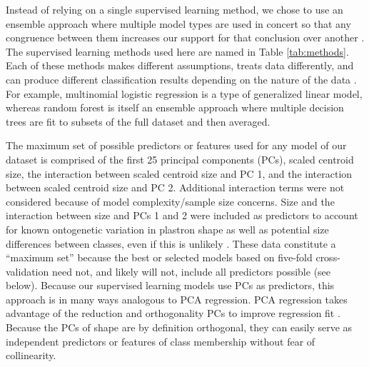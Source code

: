 \documentclass[10pt,letterpaper]{article}
\begin{document}
Instead of relying on a single supervised learning method, we chose to use an ensemble approach where multiple model types are used in concert so that any congruence between them increases our support for that conclusion over another \cite{Hastie2009}. The supervised learning methods used here are named in Table \ref{tab:methods}. Each of these methods makes different assumptions, treats data differently, and can produce different classification results depending on the nature of the data \cite{Hastie2009}. For example, multinomial logistic regression is a type of generalized linear model, whereas random forest is itself an ensemble approach where multiple decision trees are fit to subsets of the full dataset and then averaged.

The maximum set of possible predictors or features used for any model of our dataset is comprised of the first 25 principal components (PCs), scaled centroid size, the interaction between scaled centroid size and PC 1, and the interaction between scaled centroid size and PC 2. Additional interaction terms were not considered because of model complexity/sample size concerns. Size and the interaction between size and PCs 1 and 2 were included as predictors to account for known ontogenetic variation in plastron shape \cite{Angielczyk2013a} as well as potential size differences between classes, even if this is unlikely \cite{Seeliger1945,Holland1992}. These data constitute a ``maximum set'' because the best or selected models based on five-fold cross-validation need not, and likely will not, include all predictors possible (see below). Because our supervised learning models use PCs as predictors, this approach is in many ways analogous to PCA regression. PCA regression takes advantage of the reduction and orthogonality PCs to improve regression fit \cite{Hastie2009}. Because the PCs of shape are by definition orthogonal, they can easily serve as independent predictors or features of class membership without fear of collinearity.
\end{document}
